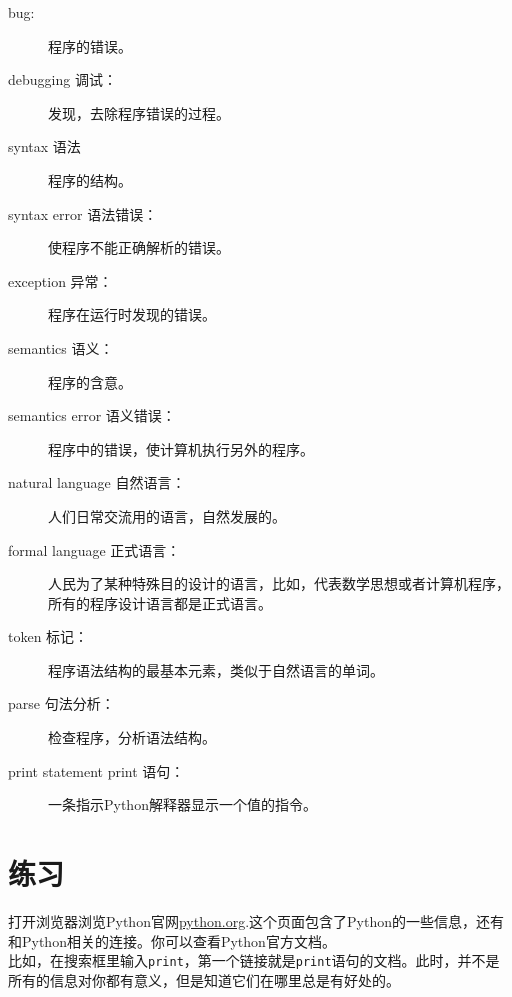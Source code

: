 \begin{description}
\item[bug:] 程序的错误。

\item[debugging 调试：]发现，去除程序错误的过程。

\item[syntax 语法] 程序的结构。

\item[syntax error 语法错误：]使程序不能正确解析的错误。


\item[exception 异常：]程序在运行时发现的错误。

\item[semantics  语义：]程序的含意。

\item[semantics error 语义错误：] 程序中的错误，使计算机执行另外的程序。

\item[natural language 自然语言：]人们日常交流用的语言，自然发展的。

\item[formal language 正式语言：]人民为了某种特殊目的设计的语言，比如，代表数学思想或者计算机程序，所有的程序设计语言都是正式语言。

\item[token 标记：]程序语法结构的最基本元素，类似于自然语言的单词。

\item[parse 句法分析：]检查程序，分析语法结构。

\item[print statement print 语句：]一条指示Python解释器显示一个值的指令。


\end{description}

\section{练习}

\begin{ex}
打开浏览器浏览Python官网\url{python.org}.这个页面包含了Python的一些信息，还有和Python相关的连接。你可以查看Python官方文档。\\

比如，在搜索框里输入{\tt print}，第一个链接就是{\tt print}语句的文档。此时，并不是所有的信息对你都有意义，但是知道它们在哪里总是有好处的。

\end{ex}

